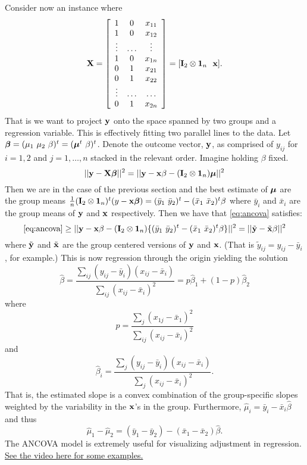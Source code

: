 Consider now an instance where
$$
\mathbf{X} =
\left[
\begin{array}{ccc}
1 & 0  & x_{11} \\
1 & 0  & x_{12} \\
\vdots &  \ldots  & \vdots \\
1  & 0 & x_{1n}  \\
0  & 1 & x_{21} \\
0  & 1 & x_{22} \\
\vdots & \ldots & \ldots \\
0  & 1 & x_{2n}
\end{array}
\right]
= [\mathbf{I}_{2} \otimes \mathbf{1}_n ~~ \mathbf{x}]
.
$$
That is we want to project $\mathbf{y}$ onto the space spanned by two groups
and a regression variable. This is effectively fitting two parallel
lines to the data.
Let $\boldsymbol{\beta} = (\mu_1 ~ \mu_2 ~ \beta)^t = (\boldsymbol{\mu}^t ~ \beta)^t$. Denote the outcome
vector, $\mathbf{y}$, as comprised of $y_{ij}$ for $i=1,2$ and $j=1,\ldots,n$
stacked in the relevant order. Imagine holding $\beta$ fixed. 
\begin{equation}
\label{eq:ancova}
|| \mathbf{y} - \mathbf{X} \boldsymbol{\beta} ||^2 = 
|| \mathbf{y} - \mathbf{x} \beta - (\mathbf{I}_2 \otimes \mathbf{1}_n) \boldsymbol{\mu} ||^2
\end{equation}
Then we
are in the case of the previous section and the best estimate
of $\boldsymbol{\mu}$ are the group means $\frac{1}{n}(\mathbf{I}_2 \otimes \mathbf{1}_n)^t(y - \mathbf{x} \boldsymbol{\beta}) = (\bar y_1 ~ \bar y_2)^t - (\bar x_1 ~ \bar x_2)^t \beta$ where
$\bar y_i$ and $\bar x_i$ are the group means of $\mathbf{y}$ and $\mathbf{x}$ respectively.
Then we have that \eqref{eq:ancova} satisfies:
$$
\eqref{eq:ancova} \geq 
|| \mathbf{y} - \mathbf{x} \beta - (\mathbf{I}_2 \otimes \mathbf{1}_n) \{(\bar y_1 ~ \bar y_2)^t - (\bar x_1 ~ \bar x_2)^t \beta\}||^2
= || \tilde {\mathbf{y}} - \tilde {\mathbf{x}} \beta||^2
$$
where $\tilde {\mathbf{y}}$ and $\tilde {\mathbf{x}}$ are the group centered versions 
of $\mathbf{y}$ and $\mathbf{x}$. (That is $\tilde y_{ij} = y_{ij} - \bar y_i$, for example.)
This is now regression through the origin yielding the solution
$$
\hat \beta 
= \frac{\sum_{ij} (y_{ij} - \bar y_i) (x_{ij} - \bar x_i)}
{\sum_{ij} (x_{ij} - \bar x_i)^2}
= p \hat \beta_1 + (1 - p) \hat \beta_2
$$
where 
$$
p = \frac{\sum_{j} (x_{1j} - \bar x_1)^2}{\sum_{ij} (x_{ij} - \bar x_i)^2}
$$
and 
$$
\hat \beta_i =
\frac{\sum_{j} (y_{ij} - \bar y_i) (x_{ij} - \bar x_i)}
{\sum_{j} (x_{ij} - \bar x_i)^2}.
$$
That is, the estimated slope is a convex combination of the
group-specific slopes weighted by the variability in the $\mathbf{x}$'s
in the group. Furthermore,
$\hat \mu_i = \bar y_i - \bar x_i \hat \beta$ and thus
$$
\hat \mu_1 - \hat \mu_2
= (\bar y_1 - \bar y_2) - (\bar x_1 - \bar x_2) \hat \beta.
$$
The ANCOVA model is extremely useful for visualizing adjustment in regression.
\href{https://www.youtube.com/watch?v=SFPM9IuP2m8&index=26&list=PLpl-gQkQivXjqHAJd2t-J_One_fYE55tC}{See the video here for some examples.}